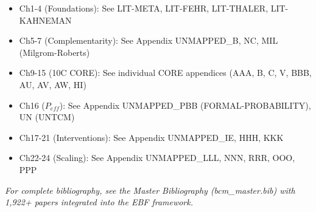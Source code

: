 \begin{itemize}[nosep]
\item Ch1-4 (Foundations): See LIT-META, LIT-FEHR, LIT-THALER, LIT-KAHNEMAN
\item Ch5-7 (Complementarity): See Appendix UNMAPPED_B, NC, MIL (Milgrom-Roberts)
\item Ch9-15 (10C CORE): See individual CORE appendices (AAA, B, C, V, BBB, AU, AV, AW, HI)
\item Ch16 ($P_{eff}$): See Appendix UNMAPPED_PBB (FORMAL-PROBABILITY), UN (UNTCM)
\item Ch17-21 (Interventions): See Appendix UNMAPPED_IE, HHH, KKK
\item Ch22-24 (Scaling): See Appendix UNMAPPED_LLL, NNN, RRR, OOO, PPP
\end{itemize}

\textit{For complete bibliography, see the Master Bibliography (bcm\_master.bib)
with 1,922+ papers integrated into the EBF framework.}

